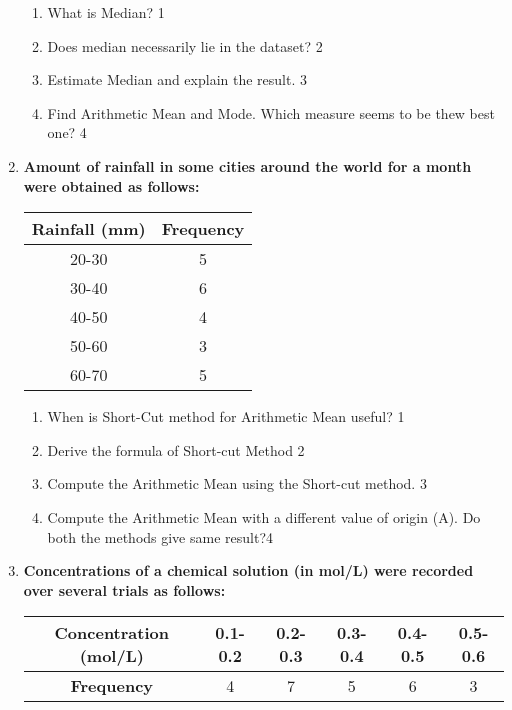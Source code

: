 \documentclass[a4paper,oneside]{book}
\begin{document}
\begin{enumerate}
  \begin{enumerate}
    \item
	What is Median? \hfill 1
    \item
	Does median necessarily lie in the dataset? \hfill 2
    \item  
	Estimate Median and explain the result. \hfill 3
    \item
	Find Arithmetic Mean and Mode. Which measure seems to be thew best one? \hfill 4
  \end{enumerate}
  
   \item
	  \textbf{Amount of rainfall in some cities around the world for a month were obtained as follows:} 
	  
	      \begin{table}[h]
    \centering
\begin{tabular}{c|c}
\textbf{Rainfall (mm)} & \textbf{Frequency} \\ \hline
20-30                  & 5                  \\ \hline
30-40                  & 6                  \\ \hline
40-50                  & 4                  \\ \hline
50-60                  & 3                  \\
60-70                  & 5                 
\end{tabular}
\end{table}

    \begin{enumerate}
    \item
	When is Short-Cut method for Arithmetic Mean useful? \hfill 1
    \item
	Derive the formula of Short-cut Method \hfill 2
    \item  
	Compute the Arithmetic Mean using the Short-cut method. \hfill 3
    \item
	Compute the Arithmetic Mean with a different value of origin (A). Do both the methods give same result?\hfill 4
  \end{enumerate}
  
  \item
\textbf{Concentrations of a chemical solution (in mol/L) were recorded over 
several trials as follows:} 

\begin{table}[h]
\centering
\begin{tabular}{c|ccccc}
\textbf{Concentration (mol/L)} & 0.1-0.2 & 0.2-0.3 & 0.3-0.4 & 0.4-0.5 & 0.5-0.6 \\ \hline
\textbf{Frequency}             & 4       & 7       & 5       & 6       & 3       
\end{tabular}
\end{table}


\end{enumerate}
\end{document}
